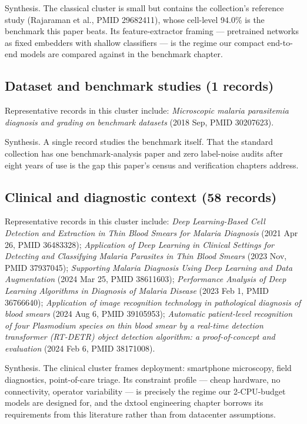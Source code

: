 Synthesis. The classical cluster is small but contains the collection's reference study (Rajaraman et al., PMID 29682411), whose cell-level 94.0\% is the benchmark this paper beats. Its feature-extractor framing --- pretrained networks as fixed embedders with shallow classifiers --- is the regime our compact end-to-end models are compared against in the benchmark chapter.


\subsection*{Dataset and benchmark studies (1 records)}
Representative records in this cluster include: \emph{Microscopic malaria parasitemia diagnosis and grading on benchmark datasets} (2018 Sep, PMID 30207623).\par

Synthesis. A single record studies the benchmark itself. That the standard collection has one benchmark-analysis paper and zero label-noise audits after eight years of use is the gap this paper's census and verification chapters address.


\subsection*{Clinical and diagnostic context (58 records)}
Representative records in this cluster include: \emph{Deep Learning-Based Cell Detection and Extraction in Thin Blood Smears for Malaria Diagnosis} (2021 Apr 26, PMID 36483328); \emph{Application of Deep Learning in Clinical Settings for Detecting and Classifying Malaria Parasites in Thin Blood Smears} (2023 Nov, PMID 37937045); \emph{Supporting Malaria Diagnosis Using Deep Learning and Data Augmentation} (2024 Mar 25, PMID 38611603); \emph{Performance Analysis of Deep Learning Algorithms in Diagnosis of Malaria Disease} (2023 Feb 1, PMID 36766640); \emph{Application of image recognition technology in pathological diagnosis of blood smears} (2024 Aug 6, PMID 39105953); \emph{Automatic patient-level recognition of four Plasmodium species on thin blood smear by a real-time detection transformer (RT-DETR) object detection algorithm: a proof-of-concept and evaluation} (2024 Feb 6, PMID 38171008).\par

Synthesis. The clinical cluster frames deployment: smartphone microscopy, field diagnostics, point-of-care triage. Its constraint profile --- cheap hardware, no connectivity, operator variability --- is precisely the regime our 2-CPU-budget models are designed for, and the dxtool engineering chapter borrows its requirements from this literature rather than from datacenter assumptions.


